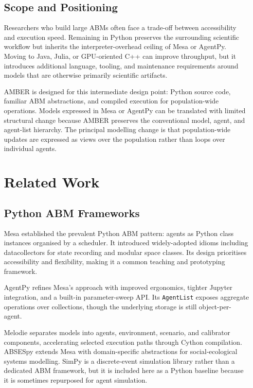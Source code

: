 \documentclass[11pt,a4paper]{article}
\begin{document}
\subsection{Scope and Positioning}

Researchers who build large ABMs often face a trade-off between accessibility and execution speed. Remaining in Python preserves the surrounding scientific workflow but inherits the interpreter-overhead ceiling of Mesa or AgentPy. Moving to Java, Julia, or GPU-oriented C++ can improve throughput, but it introduces additional language, tooling, and maintenance requirements around models that are otherwise primarily scientific artifacts.

AMBER is designed for this intermediate design point: Python source code, familiar ABM abstractions, and compiled execution for population-wide operations. Models expressed in Mesa or AgentPy can be translated with limited structural change because AMBER preserves the conventional model, agent, and agent-list hierarchy. The principal modelling change is that population-wide updates are expressed as views over the population rather than loops over individual agents.

\section{Related Work}

\subsection{Python ABM Frameworks}

Mesa \citep{masad2015mesa} established the prevalent Python ABM pattern: agents as Python class instances organised by a scheduler. It introduced widely-adopted idioms including datacollectors for state recording and modular space classes. Its design prioritises accessibility and flexibility, making it a common teaching and prototyping framework.

AgentPy \citep{foramitti2021agentpy} refines Mesa's approach with improved ergonomics, tighter Jupyter integration, and a built-in parameter-sweep API. Its \texttt{AgentList} exposes aggregate operations over collections, though the underlying storage is still object-per-agent.

Melodie \citep{yu2023melodie} separates models into agents, environment, scenario, and calibrator components, accelerating selected execution paths through Cython compilation. ABSESpy \citep{wang2024absspy} extends Mesa with domain-specific abstractions for social-ecological systems modelling. SimPy \citep{zinoviev2024discrete} is a discrete-event simulation library rather than a dedicated ABM framework, but it is included here as a Python baseline because it is sometimes repurposed for agent simulation.
\end{document}
